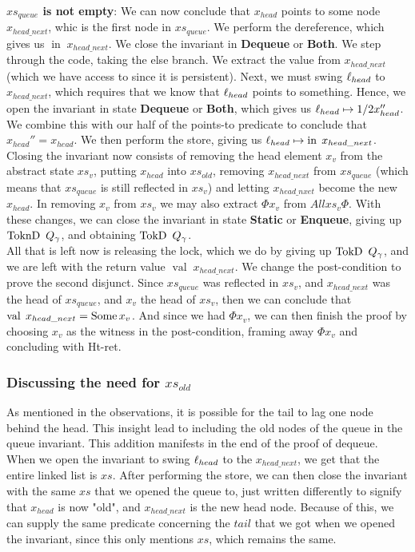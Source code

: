 \documentclass[twoside,11pt,openright]{report}
\newcommand{\nIn}[1]{\operatorname{in} \; #1}
\newcommand{\nVal}[1]{\operatorname{val} \; #1}
\newcommand{\StaticState}{\textbf{Static}}
\newcommand{\EnqueueState}{\textbf{Enqueue}}
\newcommand{\DequeueState}{\textbf{Dequeue}}
\newcommand{\BothState}{\textbf{Both}}
\newcommand{\Qgnames}{Q_\gname}
\newcommand{\TokD}[1]{\operatorname{TokD}\ #1}
\newcommand{\TokDQg}{\TokD{\Qgnames}}
\newcommand{\ToknD}[1]{\operatorname{ToknD}\ #1}
\newcommand{\ToknDQg}{\ToknD{\Qgnames}}
\begin{document}
\textbf{$xs_{queue}$ is not empty}:
We can now conclude that $x_{head}$ points to some node $x_{head\_next}$, whic is the first node in $xs_{queue}$. We perform the dereference, which gives us $\nIn{x_{head\_next}}$. We close the invariant in \DequeueState{} or \BothState{}. We step through the code, taking the else branch. We extract the value from $x_{head\_next}$ (which we have access to since it is persistent). Next, we must swing $\ell_{head}$ to $x_{head\_next}$, which requires that we know that $\ell_{head}$ points to something. Hence, we open the invariant in state \DequeueState{} or \BothState{}, which gives us $\ell_{head} \mapsto{1/2} x_{head}''$. We combine this with our half of the points-to predicate to conclude that $x_{head}'' = x_{head}$. We then perform the store, giving us $\loc_{head} \mapsto \nIn{x_{head\_next}}$. Closing the invariant now consists of removing the head element $x_v$ from the abstract state $xs_v$, putting $x_{head}$ into $xs_{old}$, removing $x_{head\_next}$ from $xs_{queue}$ (which means that $xs_{queue}$ is still reflected in $xs_{v}$) and letting $x_{head\_nxet}$ become the new $x_{head}$. In removing $x_v$ from $xs_v$ we may also extract $\Phi x_v$ from $All xs_v \Phi$. With these changes, we can close the invariant in state \StaticState{} or \EnqueueState{}, giving up $\ToknDQg$, and obtaining $\TokDQg$.\\
All that is left now is releasing the lock, which we do by giving up $\TokDQg$, and we are left with the return value $\nVal{x_{head\_next}}$. We change the post-condition to prove the second disjunct. Since $xs_{queue}$ was reflected in $xs_v$, and $x_{head\_next}$ was the head of $xs_{queue}$, and $x_v$ the head of $xs_v$, then we can conclude that $\nVal{x_{head\_next}} = \Some x_v$. And since we had $\Phi x_v$, we can then finish the proof by choosing $x_v$ as the witness in the post-condition, framing away $\Phi x_v$ and concluding with Ht-ret.

\subsubsection{Discussing the need for $xs_{old}$}\label{MSQTL:Discussion:xs_old}

As mentioned in the observations, it is possible for the tail to lag one node behind the head. This insight lead to including the old nodes of the queue in the queue invariant. This addition manifests in the end of the proof of dequeue. When we open the invariant to swing $\ell_{head}$ to the $x_{head\_next}$, we get that the entire linked list is $xs$. After performing the store, we can then close the invariant with the same $xs$ that we opened the queue to, just written differently to signify that $x_{head}$ is now "old", and $x_{head\_next}$ is the new head node. Because of this, we can supply the same predicate concerning the $tail$ that we got when we opened the invariant, since this only mentions $xs$, which remains the same.
\end{document}
